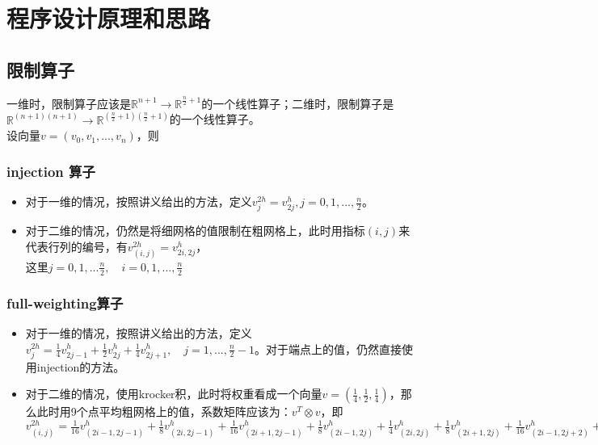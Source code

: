 \documentclass[UTF8]{ctexart}
\begin{document}
	
	\pagestyle{fancy}
	\fancyhead{}
	\rhead{\today}
	\begin{abstract}
		本次编程作业实现了多重网格求解线性方程组$Ax=b$，其中$A$是一维Poission方程或二维Poission方程离散的矩阵。
	\end{abstract}
	\section{程序设计原理和思路}
	\subsection{限制算子}
		一维时，限制算子应该是$\mathbb{R}^{n+1} \to \mathbb{R}^{\frac{n}{2}+1}$的一个线性算子；二维时，限制算子是$\mathbb{R}^{(n+1)(n+1)} \to \mathbb{R}^{(\frac{n}{2}+1)(\frac{n}{2}+1)}$的一个线性算子。\\
		设向量$v=(v_0, v_1,...,v_{n})$，则
	\subsubsection{injection 算子}
	\begin{itemize}
		\item 对于一维的情况，按照讲义给出的方法，定义$v^{2h}_j=v^h_{2j}, j=0,1,...,\frac{n}{2}$。
		\item 对于二维的情况，仍然是将细网格的值限制在粗网格上，此时用指标$(i,j)$来代表行列的编号，有$v^{2h}_{(i,j)}=v^h_{2i, 2j}$，\\
		这里$j=0,1,...\frac{n}{2}, \quad i=0,1,...,\frac{n}{2}$
	\end{itemize}
	\subsubsection{full-weighting算子}
	\begin{itemize}
		\item 对于一维的情况，按照讲义给出的方法，定义$v^{2h}_{j}=\frac{1}{4}v^h_{2j-1}+\frac{1}{2}v^h_{2j}+\frac{1}{4}v^h_{2j+1},\quad j=1,...,\frac{n}{2}-1$。对于端点上的值，仍然直接使用injection的方法。
		\item 对于二维的情况，使用krocker积，此时将权重看成一个向量$v=\left(\frac{1}{4},\frac{1}{2}, \frac{1}{4}\right)$，那么此时用9个点平均粗网格上的值，系数矩阵应该为：$v^T\otimes v$，即\\
		$v^{2h}_{(i,j)}=\frac{1}{16}v^h_{(2i-1,2j-1)}+\frac{1}{8}v^h_{(2i,2j-1)}+\frac{1}{16}v^h_{(2i+1, 2j-1)}+\frac{1}{8}v^h_{(2i-1,2j)}+\frac{1}{4}v^h_{(2i,2j)}+\frac{1}{8}v^h_{(2i+1,2j)}+\frac{1}{16}v^h_{(2i-1,2j+2)}+\frac{1}{8}v^h_{(2i,2j+1)}+\frac{1}{16}v^h_{(2i+1,2j+1)}$
	\end{itemize}
\end{document}
